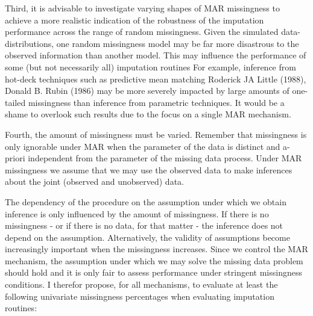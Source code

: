 \documentclass[
]{article}
\begin{document}
Third, it is advisable to investigate varying shapes of MAR missingness
to achieve a more realistic indication of the robustness of the
imputation performance across the range of random missingness. Given the
simulated data-distributions, one random missingness model may be far
more disastrous to the observed information than another model. This may
influence the performance of some (but not necessarily all) imputation
routines For example, inference from hot-deck techniques such as
predictive mean matching Roderick JA Little (1988), Donald B. Rubin
(1986) may be more severely impacted by large amounts of one-tailed
missingness than inference from parametric techniques. It would be a
shame to overlook such results due to the focus on a single MAR
mechanism.

Fourth, the amount of missingness must be varied. Remember that
missingness is only ignorable under MAR when the parameter of the data
is distinct and a-priori independent from the parameter of the missing
data process. Under MAR missingness we assume that we may use the
observed data to make inferences about the joint (observed and
unobserved) data.

The dependency of the procedure on the assumption under which we obtain
inference is only influenced by the amount of missingness. If there is
no missingness - or if there is no data, for that matter - the inference
does not depend on the assumption. Alternatively, the validity of
assumptions become increasingly important when the missingness
increases. Since we control the MAR mechanism, the assumption under
which we may solve the missing data problem should hold and it is only
fair to assess performance under stringent missingness conditions. I
therefor propose, for all mechanisms, to evaluate at least the following
univariate missingness percentages when evaluating imputation routines:
\end{document}
